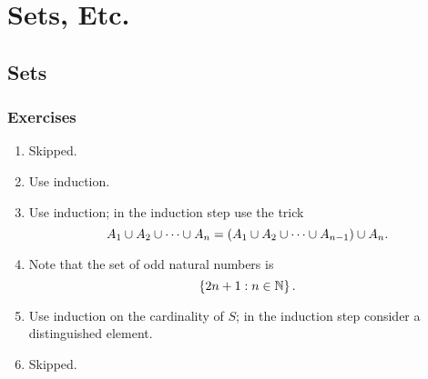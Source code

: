 \setcounter{chapter}{1}
\chapter{Sets, Etc.}
\section{Sets}
\subsection*{Exercises}
\begin{enumerate}[\thesection-1]
%
\item Skipped.
%
\item Use induction.
%
\item Use induction; in the induction step use the trick
\[
A_1 \cup A_2 \cup \cdots \cup A_n = (A_1 \cup A_2 \cup \cdots \cup A_{n - 1}) \cup A_n.
\]
%
\item Note that the set of odd natural numbers is
\[
\left\{2n + 1 : n \in \mathbb{N}\right\}.
\]
%
\item Use induction on the cardinality of $S$; in the induction step consider a distinguished element.
%
\item Skipped.
%
\end{enumerate}
